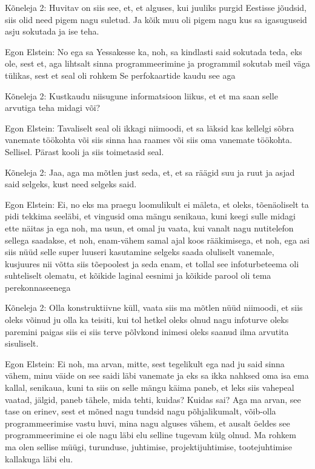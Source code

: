 Kõneleja 2:
Huvitav on siis see, et, et alguses, kui juuliks purgid Eestisse jõudsid, siis olid need pigem nagu suletud. Ja kõik muu oli pigem nagu kus sa igasuguseid asju sokutada ja ise teha.
                 
Egon Elstein:
No ega sa Yessakesse ka, noh, sa kindlasti said sokutada teda, eks ole, sest et, aga lihtsalt sinna programmeerimine ja programmil sokutab meil väga tülikas, sest et seal oli rohkem Se perfokaartide kaudu see aga
                 
Kõneleja 2:
Kustkaudu niisugune informatsioon liikus, et et ma saan selle arvutiga teha midagi või?
                 
Egon Elstein:
Tavaliselt seal oli ikkagi niimoodi, et sa läksid kas kellelgi sõbra vanemate töökohta või siis sinna haa raames või siis oma vanemate töökohta. Sellisel.
Pärast kooli ja siis toimetasid seal.
                 
Kõneleja 2:
Jaa, aga ma mõtlen just seda, et, et sa räägid suu ja ruut ja asjad said selgeks, kust need selgeks said.
                 
Egon Elstein:
Ei, no eks ma praegu loomulikult ei mäleta, et oleks, tõenäoliselt ta pidi tekkima seeläbi, et vingusid oma mängu senikaua, kuni keegi sulle midagi ette näitas ja ega noh, ma usun, et omal ju vaata, kui vanalt nagu nutitelefon sellega saadakse, et noh, enam-vähem samal ajal koos rääkimisega, et noh, ega asi siis nüüd selle super luuseri kasutamine selgeks saada oluliselt vanemale, kusjuures nii võtta siis tõepoolest ja seda enam, et tollal see infoturbeteema oli suhteliselt olematu, et kõikide laginal eesnimi ja kõikide parool oli tema perekonnaseenega
                 
Kõneleja 2:
Olla konstruktiivne küll, vaata siis ma mõtlen nüüd niimoodi, et siis oleks võinud ju olla ka teisiti, kui tol hetkel oleks olnud nagu infoturve oleks paremini paigas siis ei siis terve põlvkond inimesi oleks saanud ilma arvutita sisuliselt.
                 
Egon Elstein:
Ei noh, ma arvan, mitte, sest tegelikult ega nad ju said sinna vähem, minu väide on see saidi läbi vanemate ja eks sa ikka nahksed oma isa ema kallal, senikaua, kuni ta siis on selle mängu käima paneb, et leks siis vahepeal vaatad, jälgid, paneb tähele, mida tehti, kuidas? Kuidas sai?
Aga ma arvan, see tase on erinev, sest et mõned nagu tundsid nagu põhjalikumalt, võib-olla programmeerimise vastu huvi, mina nagu alguses vähem, et ausalt öeldes see programmeerimine ei ole nagu läbi elu selline tugevam külg olnud. Ma rohkem ma olen sellise müügi, turunduse, juhtimise, projektijuhtimise, tootejuhtimise kallakuga läbi elu.
                 
